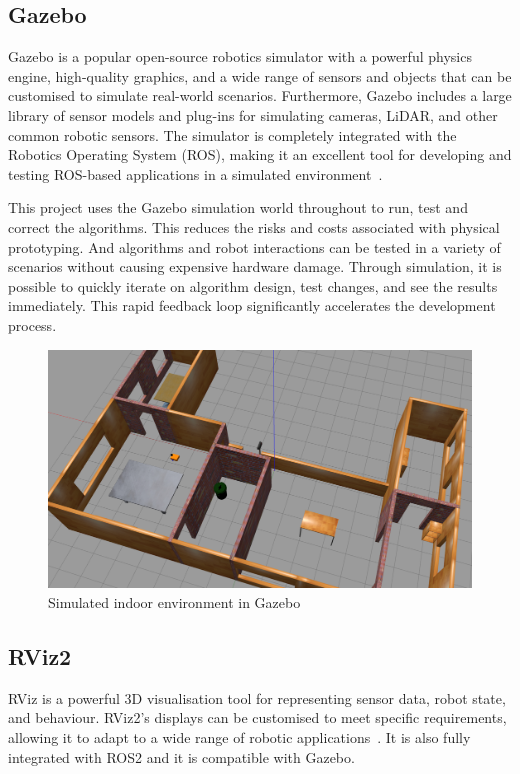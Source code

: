 \subsection{Gazebo}
Gazebo is a popular open-source robotics simulator with a powerful physics engine, high-quality graphics, 
and a wide range of sensors and objects that can be customised to simulate real-world scenarios. 
Furthermore, Gazebo includes a large library of sensor models and plug-ins for simulating cameras, LiDAR, 
and other common robotic sensors. The simulator is completely integrated with the Robotics Operating System (ROS), 
making it an excellent tool for developing and testing ROS-based applications in a simulated environment~\cite{gazebo}. 

This project uses the Gazebo simulation world throughout to run, test and correct the algorithms. 
This reduces the risks and costs associated with physical prototyping. 
And algorithms and robot interactions can be tested in a variety of scenarios without causing expensive hardware damage. 
Through simulation, it is possible to quickly iterate on algorithm design, test changes, and see the results immediately. 
This rapid feedback loop significantly accelerates the development process.
\begin{figure}[H]
    \centering
    \includegraphics[width=0.76\linewidth]{figs/gazebo_house.png}
    \caption{Simulated indoor environment in Gazebo}
\end{figure}
\subsection{RViz2}
RViz is a powerful 3D visualisation tool for representing sensor data, robot state, and behaviour.
RViz2's displays can be customised to meet specific requirements, 
allowing it to adapt to a wide range of robotic applications~\cite{rviz2}. 
It is also fully integrated with ROS2 and it is compatible with Gazebo. 

